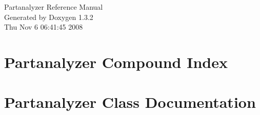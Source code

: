 \documentclass[a4paper]{book}
\begin{document}
\begin{titlepage}
\vspace*{7cm}
\begin{center}
{\Large Partanalyzer Reference Manual}\\
\vspace*{1cm}
{\large Generated by Doxygen 1.3.2}\\
\vspace*{0.5cm}
{\small Thu Nov 6 06:41:45 2008}\\
\end{center}
\end{titlepage}
\clearemptydoublepage
{}
\tableofcontents
\clearemptydoublepage
{}
\chapter{Partanalyzer Compound Index}

\chapter{Partanalyzer Class Documentation}











\printindex
\end{document}
